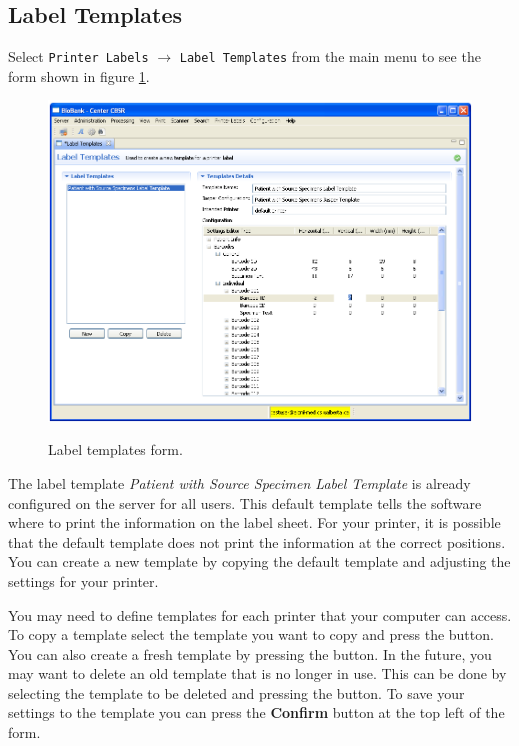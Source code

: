 \subsection{Label Templates}
\label{sec:label_templates}

Select \texttt{Printer Labels} $\to$ \texttt{Label Templates} from the main
menu to see the form shown in figure \ref{fig:label_templates_form}.

\begin{figure}[H]
  \centering
  \scalebox{0.45}
	   { \includegraphics*{screenshots/printer_labels/06_label_templates_form} }
	   \caption{Label templates form.}
	   \label{fig:label_templates_form}
\end{figure}

The label template \emph{Patient with Source Specimen Label Template} is
already configured on the server for all users. This default template
tells the software where to print the information on the label sheet.  For your
printer, it is possible that the default template does not print the information
at the correct positions. You can create a new template by copying the default
template and adjusting the settings for your printer.

You may need to define templates for each printer that your computer can
access. To copy a template select the template you want to copy and press the
 button. You can also create a fresh template by pressing the
 button. In the future, you may want to delete an old template that
is no longer in use. This can be done by selecting the template to be deleted
and pressing the  button. To save your settings to the template
you can press the \textbf{Confirm} button at the top left of the form.

